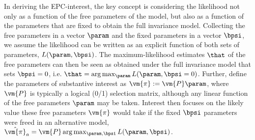 
In deriving the EPC-interest, the key concept is considering the likelihood not only as a function of the free parameters of the model, but also as a function of the parameters that are fixed to obtain the full invariance model. Collecting the free parameters in a vector $\param$ and the fixed parameters in a vector $\bpsi$, we assume the likelihood can be written as an explicit function of both sets of parameters, $L(\param, \bpsi)$.  The maximum-likelihood estimates $\that$ of the free parameters can then be seen as obtained under the full invariance model that sets $\bpsi=0$, i.e. $\that = \arg\max_{\param} L(\param, \bpsi = 0)$. Further, define the parameters of substantive interest as $\vm{\pi} := \vm{P} \param$, where $\vm{P}$ is typically a logical (0/1) selection matrix, although any linear function of the free parameters $\param$ may be taken. 
Interest then focuses on the likely value these free parameters $\vm{\pi}$ would take if the fixed $\bpsi$ parameters were freed in an alternative model, $\hat{\vm{\pi}}_a = \vm{P} \arg\max_{\param, \bpsi} L(\param, \bpsi)$. 

